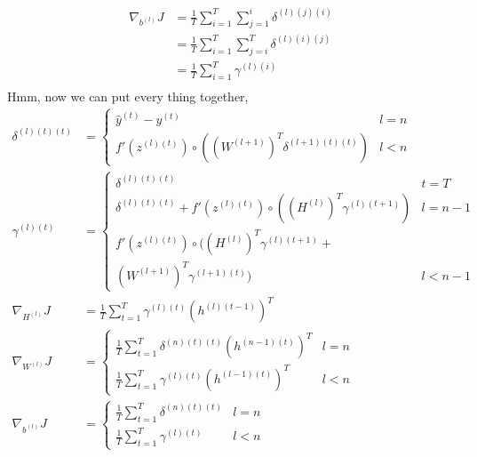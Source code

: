 \documentclass{article}
\begin{document}
	\begin{equation}
	\begin{aligned}
		\nabla_{b^{(l)}} J 
		&= \frac{1}{T} \sum_{i=1}^{T} \sum_{j=1}^{i} \delta^{(l)(j)(i)} \\
		&= \frac{1}{T} \sum_{i=1}^{T} \sum_{j=i}^{T} \delta^{(l)(i)(j)} \\
		&= \frac{1}{T} \sum_{i=1}^{T} \gamma^{(l)(i)} \\
	\end{aligned}
	\end{equation}
	Hmm, now we can put every thing together,
	\begin{align}
		\delta^{(l)(t)(t)} &=
		\begin{cases}
			\hat{y}^{(t)} - y^{(t)} &l=n\\	
			f'(z^{(l)(t)}) \circ ((W^{(l+1)})^T \delta^{(l+1)(t)(t)}) &l<n
		\end{cases} 
		\\
		\gamma^{(l)(t)} &= 
		\begin{cases}
		\delta^{(l)(t)(t)} &t=T
		\\
		\delta^{(l)(t)(t)} + f'(z^{(l)(t)}) \circ ((H^{(l)})^T \gamma^{(l)(t+1)}) &l=n-1
		\\
		f'(z^{(l)(t)}) \circ ((H^{(l)})^T \gamma^{(l)(t+1)} + \\ (W^{(l+1)})^T \gamma^{(l+1)(t)}) &l<n-1
		\end{cases}
		\\
		\nabla_{H^{(l)}} J &= \frac{1}{T} \sum_{t=1}^{T} \gamma^{(l)(t)} (h^{(l)(t-1)})^T
		\\
		\nabla_{W^{(l)}} J &= 
		\begin{cases}
		\frac{1}{T} \sum_{t=1}^{T}\delta^{(n)(t)(t)} (h^{(n-1)(t)})^T &l=n\\
		\frac{1}{T} \sum_{t=1}^{T} \gamma^{(l)(t)} (h^{(l-1)(t)})^T &l<n
		\end{cases}		
		\\
		\nabla_{b^{(l)}} J &= 
		\begin{cases}
		\frac{1}{T} \sum_{t=1}^{T}\delta^{(n)(t)(t)} &l=n \\
		\frac{1}{T} \sum_{t=1}^{T} \gamma^{(l)(t)} &l<n
		\end{cases}
	\end{align}
\end{document}
